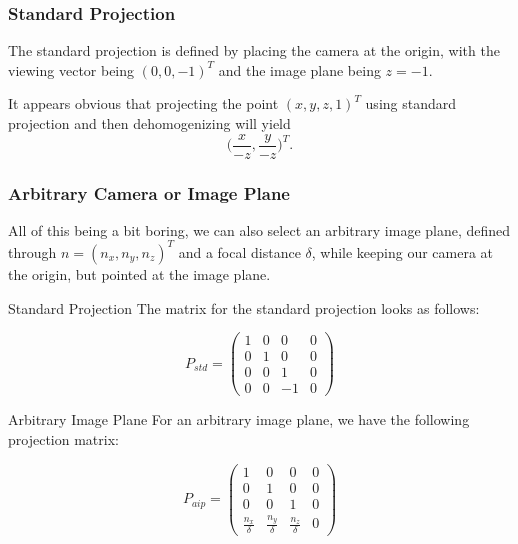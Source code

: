 \documentclass{panikzettel}
\begin{document}
\begin{halfboxl}
\subsubsection*{Standard Projection}


The standard projection is defined by placing the camera at the origin, with the viewing vector being $(0, 0, -1)^T$ and the image plane being $z = -1$.

It appears obvious that projecting the point $(x, y, z, 1)^T$ using standard projection and then dehomogenizing will yield $$\big( \frac{x}{-z}, \frac{y}{-z}\big)^T.$$

\subsubsection*{Arbitrary Camera or Image Plane}

All of this being a bit boring, we can also select an arbitrary image plane, defined through $n =(n_x, n_y, n_z)^T$ and a focal distance $\delta$, while keeping our camera at the origin, but pointed at the image plane.

\end{halfboxl}%
\begin{halfboxr}
\vspace{-\baselineskip}
\begin{defi}{Standard Projection}
The matrix for the standard projection looks as follows:

$$P_{std} =
\begin{pmatrix}
1 & 0 & 0 & 0 \\
0 & 1 & 0 & 0 \\
0 & 0 & 1 & 0 \\
0 & 0 & -1 & 0
\end{pmatrix}$$
\end{defi}

\begin{defi}{Arbitrary Image Plane}
For an arbitrary image plane, we have the following projection matrix:

$$P_{aip} =
\begin{pmatrix}
1 & 0 & 0 & 0 \\
0 & 1 & 0 & 0 \\
0 & 0 & 1 & 0 \\
\frac{n_x}{\delta} & \frac{n_y}{\delta} & \frac{n_z}{\delta} & 0
\end{pmatrix}$$
\end{defi}
\end{halfboxr}
\end{document}
